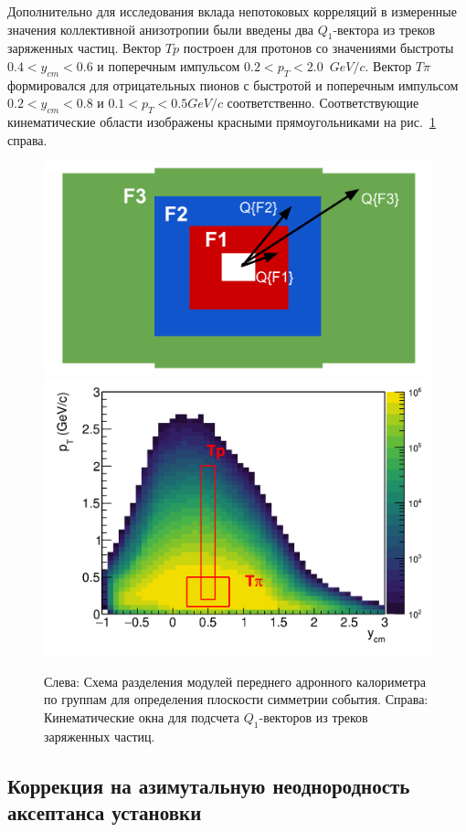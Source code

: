 Дополнительно для исследования вклада непотоковых корреляций в измеренные значения коллективной анизотропии были введены два $Q_1$-вектора из треков заряженных частиц. 
Вектор $Tp$ построен для протонов со значениями быстроты $0.4<y_{cm}<0.6$ и поперечным импульсом $0.2<p_{T}<2.0$~$GeV/c$.
Вектор $T\pi$ формировался для отрицательных пионов с быстротой и поперечным импульсом $0.2<y_{cm}<0.8$ и $0.1<p_T<0.5 GeV/c$ соответственно.
Соответствующие кинематические области изображены красными прямоугольниками на рис.~\ref{fig:bmn_subevents} справа.
%
\begin{figure}[ht]
\begin{center}
\includegraphics[width=0.45\linewidth]{images/FHCal_layout.png}
\includegraphics[width=0.45\linewidth]{images/pT_ycm_protons.png}
\caption{
Слева: Схема разделения модулей переднего адронного калориметра по группам для определения плоскости симметрии события.
Справа: Кинематические окна для подсчета $Q_1$-векторов из треков заряженных частиц.
}
\label{fig:bmn_subevents}
\end{center}
\end{figure}

\subsection{Коррекция на азимутальную неоднородность аксептанса установки}

